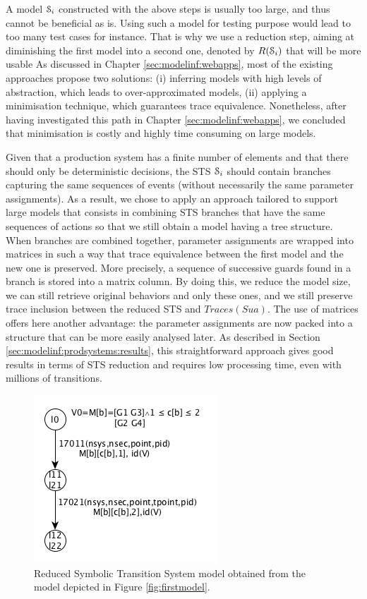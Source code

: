 A model $\EuScript{S}_i$ constructed with the above steps is
usually too large, and thus cannot be beneficial as is. Using
such a model for testing purpose would lead to too many test
cases for instance. That is why we use a reduction step, aiming
at diminishing the first model into a second one, denoted by
$R(\EuScript{S}_i)$ that will be more usable As discussed in
Chapter \ref{sec:modelinf:webapps}, most of the existing
approaches propose two solutions: (i) inferring models with high
levels of abstraction, which leads to over-approximated models,
(ii) applying a minimisation technique, which guarantees trace
equivalence.  Nonetheless, after having investigated this path in
Chapter \ref{sec:modelinf:webapps}, we concluded that
minimisation is costly and highly time consuming on large models.

Given that a production system has a finite number of elements
and that there should only be deterministic decisions, the STS
$\EuScript{S}_i$ should contain branches capturing the same
sequences of events (without necessarily the same parameter
assignments).  As a result, we chose to apply an approach
tailored to support large models that
consists in combining STS branches that have the same
sequences of actions so that we still obtain a model having a
tree structure. When branches are combined together, parameter
assignments are wrapped into matrices in such a way that trace
equivalence between the first model and the new one is preserved.
More precisely, a sequence of successive guards found in a branch
is stored into a matrix column. By doing this, we reduce the
model size, we can still retrieve original behaviors and only
these ones, and we still preserve trace inclusion between the
reduced STS and $Traces(Sua)$.
The use of matrices offers here another advantage: the parameter
assignments are now packed into a structure that can be more
easily analysed later. As described in Section
\ref{sec:modelinf:prodsystems:results}, this straightforward
approach gives good results in terms of STS reduction and
requires low processing time, even with millions of transitions.

\begin{figure}[h]
    \includegraphics[width=0.5\linewidth]{figures/STS2.png}

	\caption{Reduced Symbolic Transition System model obtained
    from the model depicted in Figure \ref{fig:firstmodel}.}
	\label{fig:reduced-model}
\end{figure}

